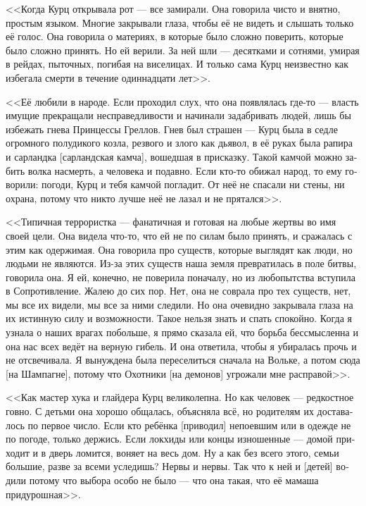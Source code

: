 \documentclass[a4paper,12pt,fleqn]{book}\usepackage{cooltooltips}\usepackage{polyglossia}\setdefaultlanguage[babelshorthands=true]{russian}\setotherlanguage{english}\defaultfontfeatures{Ligatures=TeX,Mapping=tex-text} \usepackage{xcolor}\definecolor{lightgray}{HTML}{bbbbbb}\color{lightgray}\newcommand{\ml}[3]{\textenglish{\textcolor{black}{#3}}}
\begin{document}
<<Когда Курц открывала рот --- все замирали.
Она говорила чисто и внятно, простым языком.
Многие закрывали глаза, чтобы её не видеть и слышать только её голос.
Она говорила о материях, в которые было сложно поверить, которые было сложно принять.
Но ей верили.
За ней шли --- десятками и сотнями, умирая в рейдах, пыточных, погибая на виселицах.
И только сама Курц неизвестно как избегала смерти в течение одиннадцати лет>>.

<<Её любили в народе.
Если проходил слух, что она появлялась где-то --- власть имущие прекращали несправедливости и начинали задабривать людей, лишь бы избежать гнева Принцессы Греллов.
Гнев был страшен --- Курц была в седле огромного полудикого козла, резвого и злого как дьявол, в её руках была рапира и сарландка [сарландская камча], вошедшая в присказку.
Такой камчой можно забить волка насмерть, а человека и подавно.
Если кто-то обижал народ, то ему говорили: погоди, Курц и тебя камчой погладит.
От неё не спасали ни стены, ни охрана, потому что никто лучше неё не лазал и не прятался>>.

<<Типичная террористка --- фанатичная и готовая на любые жертвы во имя своей цели.
Она видела что-то, что ей не по силам было принять, и сражалась с этим как одержимая.
Она говорила про существ, которые выглядят как люди, но людьми не являются.
Из-за этих существ наша земля превратилась в поле битвы, говорила она.
Я ей, конечно, не поверила поначалу, но из любопытства вступила в Сопротивление.
Жалею до сих пор.
Нет, она не соврала про тех существ, нет, мы все их видели, мы все за ними следили.
Но она очевидно закрывала глаза на их истинную силу и возможности.
Такое нельзя знать и спать спокойно.
Когда я узнала о наших врагах побольше, я прямо сказала ей, что борьба бессмысленна и она нас всех ведёт на верную гибель.
И она ответила, чтобы я убиралась прочь и не отсвечивала.
Я вынуждена была переселиться сначала на Вольке, а потом сюда [на Шампагне], потому что Охотники [на демонов] угрожали мне расправой>>.

<<Как мастер хука и глайдера Курц великолепна.
Но как человек --- редкостное говно.
С детьми она хорошо общалась, объясняла всё, но родителям их доставалось по первое число.
Если кто ребёнка [приводил] непоевшим или в одежде не по погоде, только держись.
Если локхиды или концы изношенные --- домой приходит и в дверь ломится, воняет на весь дом.
Ну а как без всего этого, семьи большие, разве за всеми уследишь?
Нервы и нервы.
Так что к ней и [детей] водили потому что выбора особо не было --- что она такая, что её мамаша придурошная>>.
\end{document}
